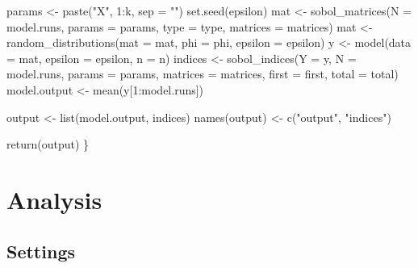 \documentclass[
  11pt,
]{article}
\newenvironment{Shaded}{\begin{snugshade}}{\end{snugshade}}
\newcommand{\AttributeTok}[1]{\textcolor[rgb]{0.77,0.63,0.00}{#1}}
\newcommand{\DecValTok}[1]{\textcolor[rgb]{0.00,0.00,0.81}{#1}}
\newcommand{\FunctionTok}[1]{\textcolor[rgb]{0.00,0.00,0.00}{#1}}
\newcommand{\NormalTok}[1]{#1}
\newcommand{\OtherTok}[1]{\textcolor[rgb]{0.56,0.35,0.01}{#1}}
\newcommand{\SpecialCharTok}[1]{\textcolor[rgb]{0.00,0.00,0.00}{#1}}
\newcommand{\StringTok}[1]{\textcolor[rgb]{0.31,0.60,0.02}{#1}}
\begin{document}
\begin{Shaded}
\begin{Highlighting}[]
\NormalTok{  params }\OtherTok{\textless{}{-}} \FunctionTok{paste}\NormalTok{(}\StringTok{"X"}\NormalTok{, }\DecValTok{1}\SpecialCharTok{:}\NormalTok{k, }\AttributeTok{sep =} \StringTok{""}\NormalTok{)}
  \FunctionTok{set.seed}\NormalTok{(epsilon)}
\NormalTok{  mat }\OtherTok{\textless{}{-}} \FunctionTok{sobol\_matrices}\NormalTok{(}\AttributeTok{N =}\NormalTok{ model.runs, }\AttributeTok{params =}\NormalTok{ params, }\AttributeTok{type =}\NormalTok{ type,}
                        \AttributeTok{matrices =}\NormalTok{ matrices)}
\NormalTok{  mat }\OtherTok{\textless{}{-}} \FunctionTok{random\_distributions}\NormalTok{(}\AttributeTok{mat =}\NormalTok{ mat, }\AttributeTok{phi =}\NormalTok{ phi, }\AttributeTok{epsilon =}\NormalTok{ epsilon)}
\NormalTok{  y }\OtherTok{\textless{}{-}} \FunctionTok{model}\NormalTok{(}\AttributeTok{data =}\NormalTok{ mat, }\AttributeTok{epsilon =}\NormalTok{ epsilon, }\AttributeTok{n =}\NormalTok{ n)}
\NormalTok{  indices }\OtherTok{\textless{}{-}} \FunctionTok{sobol\_indices}\NormalTok{(}\AttributeTok{Y =}\NormalTok{ y, }\AttributeTok{N =}\NormalTok{ model.runs, }\AttributeTok{params =}\NormalTok{ params, }\AttributeTok{matrices =}\NormalTok{ matrices,}
                           \AttributeTok{first =}\NormalTok{ first, }\AttributeTok{total =}\NormalTok{ total)}
\NormalTok{  model.output }\OtherTok{\textless{}{-}} \FunctionTok{mean}\NormalTok{(y[}\DecValTok{1}\SpecialCharTok{:}\NormalTok{model.runs])}

\NormalTok{  output }\OtherTok{\textless{}{-}} \FunctionTok{list}\NormalTok{(model.output, indices)}
  \FunctionTok{names}\NormalTok{(output) }\OtherTok{\textless{}{-}} \FunctionTok{c}\NormalTok{(}\StringTok{"output"}\NormalTok{, }\StringTok{"indices"}\NormalTok{)}

  \FunctionTok{return}\NormalTok{(output)}
\NormalTok{\}}
\end{Highlighting}
\end{Shaded}

\hypertarget{analysis}{%
\section{Analysis}\label{analysis}}

\hypertarget{settings}{%
\subsection{Settings}\label{settings}}
\end{document}
